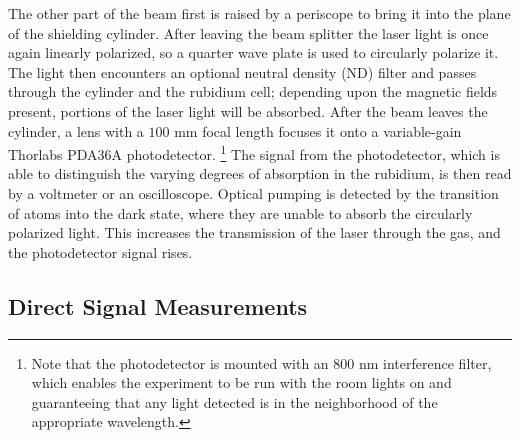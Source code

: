The other part of the beam first is raised by a periscope to bring it into the plane of the shielding cylinder. After leaving the beam splitter the laser light is once again linearly polarized, so a quarter wave plate is used to circularly polarize it. The light then encounters an optional neutral density (ND) filter and passes through the cylinder and the rubidium cell; depending upon the magnetic fields present, portions of the laser light will be absorbed. After the beam leaves the cylinder, a lens with a $100$ mm focal length focuses it onto a variable-gain Thorlabs PDA36A photodetector. \footnote{Note that the photodetector is mounted with an $800$ nm interference filter, which enables the experiment to be run with the room lights on and guaranteeing that any light detected is in the neighborhood of the appropriate wavelength.} The signal from the photodetector, which is able to distinguish the varying degrees of absorption in the rubidium, is then read by a voltmeter or an oscilloscope. Optical pumping is detected by the transition of atoms into the dark state, where they are unable to absorb the circularly polarized light. This increases the transmission of the laser through the gas, and the photodetector signal rises.


\subsection{Direct Signal Measurements}\label{directsignalmeasurements}

